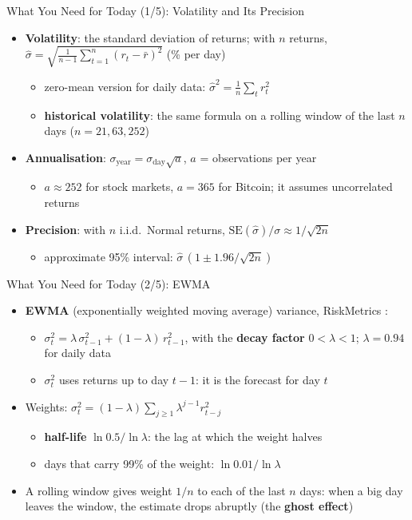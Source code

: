 \begin{frame}{What You Need for Today (1/5): Volatility and Its Precision}
\itemsize{\small}
\begin{itemize}
    \item \textbf{Volatility}: the standard deviation of returns; with $n$ returns, $\hat\sigma = \sqrt{\frac{1}{n-1}\sum_{t=1}^n (r_t - \bar r)^2}$ (\% per day)
    \begin{itemize}
        \item zero-mean version for daily data: $\hat\sigma^2 = \frac{1}{n}\sum_t r_t^2$
        \item \textbf{historical volatility}: the same formula on a rolling window of the last $n$ days ($n = 21, 63, 252$)
    \end{itemize}
    \item \textbf{Annualisation}: $\sigma_{\text{year}} = \sigma_{\text{day}}\sqrt{a}$, $a$ = observations per year
    \begin{itemize}
        \item $a \approx 252$ for stock markets, $a = 365$ for Bitcoin; it assumes uncorrelated returns
    \end{itemize}
    \item \textbf{Precision}: with $n$ i.i.d.\ Normal returns, $\mathrm{SE}(\hat\sigma)/\sigma \approx 1/\sqrt{2n}$
    \begin{itemize}
        \item approximate 95\% interval: $\hat\sigma\,(1 \pm 1.96/\sqrt{2n})$
    \end{itemize}
\end{itemize}
\end{frame}

\begin{frame}{What You Need for Today (2/5): EWMA}
\itemsize{\small}
\begin{itemize}
    \item \textbf{EWMA} (exponentially weighted moving average) variance, RiskMetrics :
    \begin{itemize}
        \item $\sigma_t^2 = \lambda\,\sigma_{t-1}^2 + (1-\lambda)\,r_{t-1}^2$, with the \textbf{decay factor} $0 < \lambda < 1$; $\lambda = 0.94$ for daily data
        \item $\sigma_t^2$ uses returns up to day $t-1$: it is the forecast for day $t$
    \end{itemize}
    \item Weights: $\sigma_t^2 = (1-\lambda)\sum_{j \ge 1}\lambda^{j-1}r_{t-j}^2$
    \begin{itemize}
        \item \textbf{half-life} $\ln 0.5/\ln\lambda$: the lag at which the weight halves
        \item days that carry 99\% of the weight: $\ln 0.01/\ln\lambda$
    \end{itemize}
    \item A rolling window gives weight $1/n$ to each of the last $n$ days: when a big day leaves the window, the estimate drops abruptly (the \textbf{ghost effect})
\end{itemize}
\end{frame}

